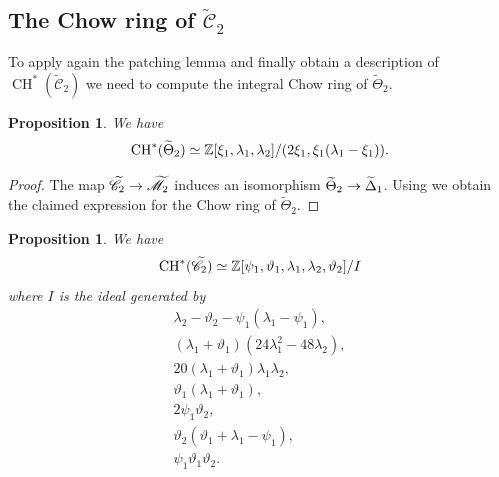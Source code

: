 \documentclass[a4paper, 10pt]{amsart}
\numberwithin{equation}{section}
\numberwithin{subsection}{section}
\newtheorem{proposition}[theorem]{Proposition}
\theoremstyle{definition}
\theoremstyle{remark}
\renewcommand{\mathcal}{\mathscr}
\newcommand\arr{\ifinner\to\else\longrightarrow\fi}
\newcommand{\Mtilde}{\widetilde{\mathcal M}}
\newcommand{\Ctilde}{\widetilde{\mathcal C}}
\newcommand{\Dtilde}{\widetilde{\Delta}}
\newcommand{\ThTilde}{\widetilde{\Theta}}
\newcommand{\ch}[1][*]{\operatorname{CH}^{#1}}
\begin{document}
	\subsection{The Chow ring of $\Ctilde_2$}
	To apply again the patching lemma and finally obtain a description of $\ch(\Ctilde_2)$ we need to compute the integral Chow ring of $\ThTilde_2$.
	\begin{proposition}\label{prop:chow ThTilde2}
		We have
		\[ \ch(\ThTilde_2)\simeq \ZZ[\xi_1,\lambda_1,\lambda_2]/(2\xi_1,\xi_1(\lambda_1-\xi_1)). \]
	\end{proposition}
	\begin{proof}
		The map $\Ctilde_2\arr\Mtilde_2$ induces an isomorphism $\ThTilde_2\arr\Dtilde_1$. 
	  Using  we obtain the claimed expression for the Chow ring of $\ThTilde_2$.
	\end{proof}
	\begin{proposition}\label{prop:chow Ctilde2}
		We have
		\[ \ch(\Ctilde_2)\simeq \ZZ[\psi_1,\vartheta_1,\lambda_1,\lambda_2,\vartheta_2]/I\]
		where $I$ is the ideal generated by
		\begin{align*}
			\lambda_2-\vartheta_2-\psi_1(\lambda_1-\psi_1),\\
			(\lambda_1+\vartheta_1)(24\lambda_1^2-48\lambda_2),\\
			20(\lambda_1+\vartheta_1)\lambda_1\lambda_2,\\
			\vartheta_1(\lambda_1+\vartheta_1),\\
			2\psi_1\vartheta_2,\\
			\vartheta_2(\vartheta_1+\lambda_1-\psi_1),\\
			\psi_1\vartheta_1\vartheta_2.
		\end{align*}
	\end{proposition}
\end{document}
